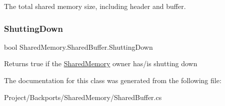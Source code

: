 The total shared memory size, including header and buffer. 

\mbox{\label{class_shared_memory_1_1_shared_buffer_a598ee38e06ba63929f51946963694b72}} 
\subsubsection{\texorpdfstring{Shutting\+Down}{ShuttingDown}}
{\footnotesize\ttfamily bool Shared\+Memory.\+Shared\+Buffer.\+Shutting\+Down\hspace{0.3cm}{\ttfamily [get]}}



Returns true if the \hyperlink{namespace_shared_memory}{Shared\+Memory} owner has/is shutting down 



The documentation for this class was generated from the following file\+:\begin{DoxyCompactItemize}
\item 
Project/\+Backports/\+Shared\+Memory/Shared\+Buffer.\+cs\end{DoxyCompactItemize}
